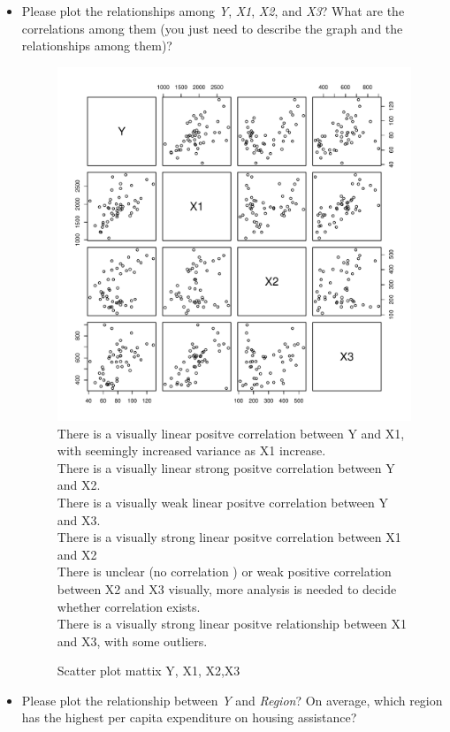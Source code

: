 \documentclass[12pt,letterpaper]{article}
\begin{document}
\begin{itemize}

\item
Please plot the relationships among \emph{Y}, \emph{X1}, \emph{X2}, and \emph{X3}? What are the correlations among them (you just need to describe the graph and the relationships among them)?

\begin{figure}[h!]\centering
	
	\caption{\footnotesize Scatter plot mattix Y, X1, X2,X3}
	\label{fig:plot_1}
	\includegraphics[width=.75\textwidth]{relationships.pdf}
\\There is a visually linear positve correlation between Y and X1, with seemingly increased variance as X1 increase.
\\There is a visually linear strong positve correlation between Y and X2.
\\There is a visually weak linear positve correlation between Y and X3.
\\There is a visually strong linear positve correlation between X1 and X2
\\There is unclear (no correlation ) or weak positive correlation between X2 and X3 visually, more analysis is needed to decide whether correlation exists.
\\There is a visually strong linear positve relationship between X1 and X3, with some outliers.
\end{figure}
\vspace{.5cm}
\item
Please plot the relationship between \emph{Y} and \emph{Region}? On average, which region has the highest per capita expenditure on housing assistance?

\end{itemize}
\end{document}
